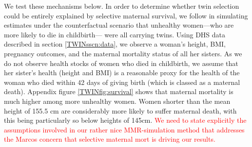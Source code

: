 \documentclass[subeqn]{article}
\begin{document}
\begin{spacing}{1.4}
We test these mechanisms below.  In order to determine whether twin selection
could be entirely explained by selective maternal survival, we follow 
\citet{Aldermanetal2011} in simulating estimates under the counterfactual 
scenario that unhealthy women---who are more likely to die in childbirth---%
were all carrying twins. Using DHS data described in section 
\ref{TWINsscn:data}, we observe a woman's height, BMI, pregnancy outcomes, and 
the maternal mortality status of all her sisters.  As we do not observe health 
stocks of women who died in childbirth, we assume that her sister's health 
(height and BMI) is a reasonable proxy for the health of the woman who died 
within 42 days of giving birth (which is classed as a maternal death).  Appendix 
figure \ref{TWINfig:survival} shows that maternal mortality is much higher among 
more unhealthy women.  Women shorter than the mean height of 155.5 cm are 
considerably more likely to suffer maternal death, with this being particularly 
so below heights of 145cm. \textcolor{red}{We need to state explicitly the 
assumptions involved in our rather nice MMR-simulation method that addresses the 
Marcos concern that selective maternal mort is driving our results.}


\end{spacing}
\end{document}
